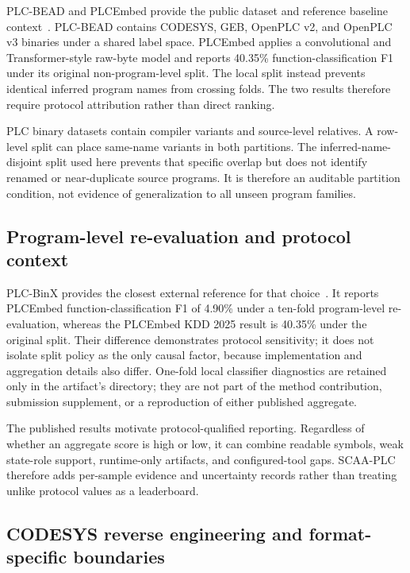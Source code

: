 \documentclass[manuscript,screen,review]{acmart}
\begin{document}
PLC-BEAD and PLCEmbed provide the public dataset and reference baseline context~\cite{plcbead_plcembed_kdd2025,plcbead_plcembed_repo}. PLC-BEAD contains CODESYS, GEB, OpenPLC v2, and OpenPLC v3 binaries under a shared label space. PLCEmbed applies a convolutional and Transformer-style raw-byte model and reports 40.35\% function-classification F1 under its original non-program-level split. The local split instead prevents identical inferred program names from crossing folds. The two results therefore require protocol attribution rather than direct ranking.

PLC binary datasets contain compiler variants and source-level relatives. A row-level split can place same-name variants in both partitions. The inferred-name-disjoint split used here prevents that specific overlap but does not identify renamed or near-duplicate source programs. It is therefore an auditable partition condition, not evidence of generalization to all unseen program families.

\subsection{Program-level re-evaluation and protocol context}

PLC-BinX provides the closest external reference for that choice~\cite{plcbinx_arxiv2026}. It reports PLCEmbed function-classification F1 of 4.90\% under a ten-fold program-level re-evaluation, whereas the PLCEmbed KDD 2025 result is 40.35\% under the original split. Their difference demonstrates protocol sensitivity; it does not isolate split policy as the only causal factor, because implementation and aggregation details also differ. One-fold local classifier diagnostics are retained only in the artifact's  directory; they are not part of the method contribution, submission supplement, or a reproduction of either published aggregate.

The published results motivate protocol-qualified reporting. Regardless of whether an aggregate score is high or low, it can combine readable symbols, weak state-role support, runtime-only artifacts, and configured-tool gaps. SCAA-PLC therefore adds per-sample evidence and uncertainty records rather than treating unlike protocol values as a leaderboard.

\subsection{CODESYS reverse engineering and format-specific boundaries}
\end{document}
